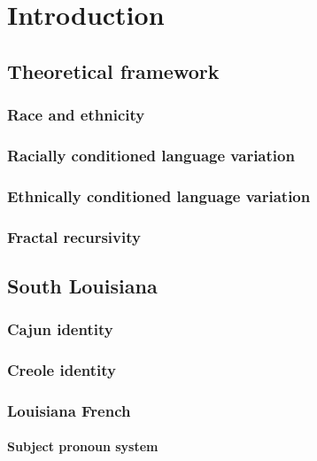 \chapter{Introduction}
  \section{Theoretical framework}
    \subsection{Race and ethnicity}
    \subsection{Racially conditioned language variation}
    \subsection{Ethnically conditioned language variation}
    \subsection{Fractal recursivity}
  \section{South Louisiana}
    \subsection{Cajun identity}
    \subsection{Creole identity}
    \subsection{Louisiana French}
      \subsubsection{Subject pronoun system}




